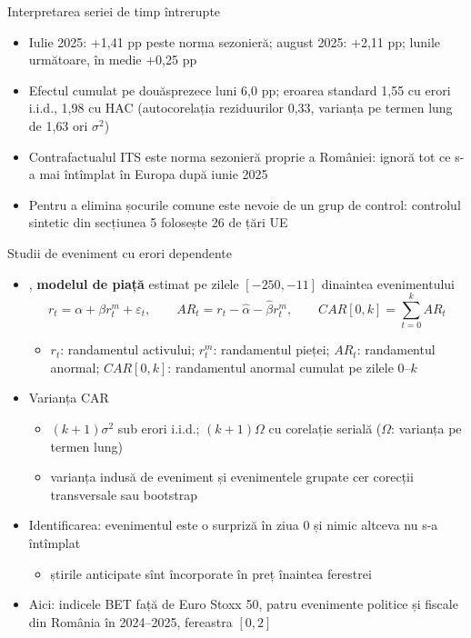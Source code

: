 \begin{frame}{Interpretarea seriei de timp întrerupte}
\itemsize{\small}
\begin{itemize}
    \item Iulie 2025: +1{,}41 pp peste norma sezonieră; august 2025: +2{,}11 pp; lunile următoare, în medie +0{,}25 pp
    \item Efectul cumulat pe douăsprezece luni 6{,}0 pp; eroarea standard 1{,}55 cu erori i.i.d., 1{,}98 cu HAC (autocorelația reziduurilor 0{,}33, varianța pe termen lung de 1{,}63 ori $\sigma^2$)
    \item Contrafactualul ITS este norma sezonieră proprie a României: ignoră tot ce s-a mai întîmplat în Europa după iunie 2025
    \item Pentru a elimina șocurile comune este nevoie de un grup de control: controlul sintetic din secțiunea 5 folosește 26 de țări UE
\end{itemize}
\end{frame}

\begin{frame}{Studii de eveniment cu erori dependente}
\itemsize{\small}
\begin{itemize}
    \item {}, \textbf{modelul de piață} estimat pe zilele $[-250, -11]$ dinaintea evenimentului \[ r_t = \alpha + \beta r^m_t + \varepsilon_t, \qquad AR_t = r_t - \hat\alpha - \hat\beta r^m_t, \qquad CAR[0, k] = \sum_{t=0}^k AR_t \]
    \begin{itemize}
        \item $r_t$: randamentul activului; $r^m_t$: randamentul pieței; $AR_t$: randamentul anormal; $CAR[0, k]$: randamentul anormal cumulat pe zilele 0--$k$
    \end{itemize}
    \item Varianța CAR
    \begin{itemize}
        \item $(k + 1)\sigma^2$ sub erori i.i.d.; $(k + 1)\Omega$ cu corelație serială ($\Omega$: varianța pe termen lung)
        \item varianța indusă de eveniment și evenimentele grupate cer corecții transversale sau bootstrap
    \end{itemize}
    \item Identificarea: evenimentul este o surpriză în ziua 0 și nimic altceva nu s-a întîmplat
    \begin{itemize}
        \item știrile anticipate sînt încorporate în preț înaintea ferestrei
    \end{itemize}
    \item Aici: indicele BET față de Euro Stoxx 50, patru evenimente politice și fiscale din România în 2024--2025, fereastra $[0, 2]$
\end{itemize}
\end{frame}

